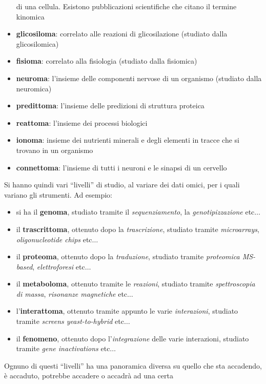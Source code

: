 \documentclass[a4paper,12pt, oneside]{book}
\begin{document}
\begin{shaded}
\begin{itemize}
    di una cellula. Esistono pubblicazioni scientifiche che citano il termine
    kinomica 
    \item \textbf{glicosiloma}: correlato alle reazioni di glicosilazione
    (studiato dalla glicosilomica)
    \item \textbf{fisioma}: correlato alla fisiologia (studiato dalla fisiomica)
    \item \textbf{neuroma}: l'insieme delle componenti nervose di un organismo
    (studiato dalla neuromica) 
    \item \textbf{predittoma}: l'insieme delle predizioni di struttura proteica
    \item \textbf{reattoma}: l'insieme dei processi biologici
    \item \textbf{ionoma}: insieme dei nutrienti minerali e degli elementi in
    tracce che si trovano in un organismo 
    \item \textbf{connettoma}: l'insieme di tutti i neuroni e le sinapsi di un
    cervello 
  \end{itemize}
\end{shaded}
Si hanno quindi vari ``livelli'' di studio, al variare dei dati omici, per i
quali variano gli strumenti. Ad esempio:
\begin{itemize}
  \item si ha il \textbf{genoma}, studiato tramite il \textit{sequenziamento},
  la \textit{genotipizzazione} etc$\ldots$
  \item il \textbf{trascrittoma}, ottenuto dopo la \textit{trascrizione},
  studiato tramite \textit{microarrays}, \textit{oligonucleotide chips}
  etc$\ldots$
  \item il \textbf{proteoma}, ottenuto dopo la \textit{traduzione}, studiato
  tramite \textit{proteomica MS-based}, \textit{elettroforesi} etc$\ldots$
  \item il \textbf{metaboloma}, ottenuto tramite le \textit{reazioni}, studiato
  tramite \textit{spettroscopia di massa}, \textit{risonanze magnetiche}
  etc$\ldots$
  \item l'\textbf{interattoma}, ottenuto tramite appunto le varie
  \textit{interazioni}, studiato tramite \textit{screens yeast-to-hybrid}
  etc$\ldots$ 
  \item il \textbf{fenomeno}, ottenuto dopo l'\textit{integrazione} delle varie
  interazioni, studiato tramite \textit{gene inactivations} etc$\ldots$
\end{itemize}
Ognuno di questi ``livelli'' ha una panoramica diversa su quello che sta
accadendo, è accaduto, potrebbe accadere o accadrà ad una certa
\end{document}
